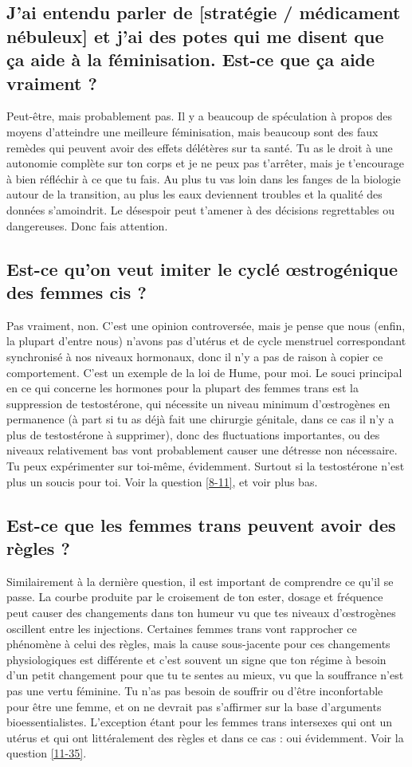 \documentclass{article}
\begin{document}
\subsection{J'ai entendu parler de [stratégie / médicament nébuleux] et j'ai des potes qui me disent que ça aide à la féminisation. Est-ce que ça aide vraiment ?}

Peut-être, mais probablement pas. Il y a beaucoup de spéculation à propos des moyens d'atteindre une meilleure féminisation, mais beaucoup sont des faux remèdes qui peuvent avoir des effets délétères sur ta santé. Tu as le droit à une autonomie complète sur ton corps et je ne peux pas t'arrêter, mais je t'encourage à bien réfléchir à ce que tu fais. Au plus tu vas loin dans les fanges de la biologie autour de la transition, au plus les eaux deviennent troubles et la qualité des données s'amoindrit. Le désespoir peut t'amener à des décisions regrettables ou dangereuses. Donc fais attention.

\subsection{Est-ce qu'on veut imiter le cyclé œstrogénique des femmes cis ?}\label{11-10}

Pas vraiment, non. C'est une opinion controversée, mais je pense que nous (enfin, la plupart d'entre nous) n'avons pas d'utérus et de cycle menstruel correspondant synchronisé à nos niveaux hormonaux, donc il n'y a pas de raison à copier ce comportement. C'est un exemple de la loi de Hume, pour moi. Le souci principal en ce qui concerne les hormones pour la plupart des femmes trans est la suppression de testostérone, qui nécessite un niveau minimum d'œstrogènes en permanence (à part si tu as déjà fait une chirurgie génitale, dans ce cas il n'y a plus de testostérone à supprimer), donc des fluctuations importantes, ou des niveaux relativement bas vont probablement causer une détresse non nécessaire. Tu peux expérimenter sur toi-même, évidemment. Surtout si la testostérone n'est plus un soucis pour toi. Voir la question \ref{8-11}, et voir plus bas.

\subsection{Est-ce que les femmes trans peuvent avoir des règles ?}

Similairement à la dernière question, il est important de comprendre ce qu'il se passe. La courbe produite par le croisement de ton ester, dosage et fréquence peut causer des changements dans ton humeur vu que tes niveaux d'œstrogènes oscillent entre les injections. Certaines femmes trans vont rapprocher ce phénomène à celui des règles, mais la cause sous-jacente pour ces changements physiologiques est différente et c'est souvent un signe que ton régime à besoin d'un petit changement pour que tu te sentes au mieux, vu que la souffrance n'est pas une vertu féminine. Tu n'as pas besoin de souffrir ou d'être inconfortable pour être une femme, et on ne devrait pas s'affirmer sur la base d'arguments bioessentialistes. L'exception étant pour les femmes trans intersexes qui ont un utérus et qui ont littéralement des règles et dans ce cas : oui évidemment. Voir la question \ref{11-35}.
\end{document}
